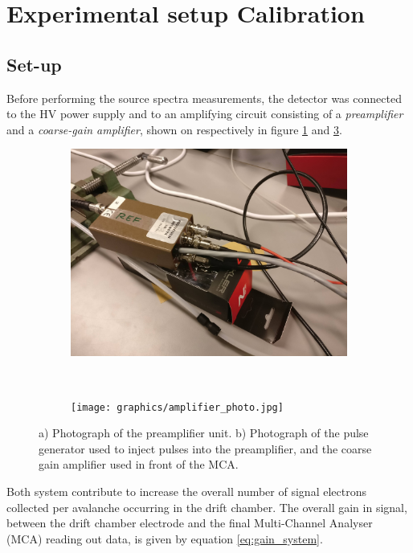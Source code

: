 \section{Experimental setup Cali\-bra\-ti\-on}

\subsection{Set-up}
\label{sec:calibration:set-up}
Before performing the source spectra measurements, the detector was connected to the HV power supply and to an amplifying circuit consisting of a \textit{preamplifier} and a \textit{coarse-gain amplifier}, shown on respectively in figure \ref{fig:preamp_photo} and \ref{fig:ampli_gene}. 

\begin{figure}[htb!]
  \begin{subfigure}[b]{0.45\textwidth}
    \includegraphics[width=\textwidth]{graphics/preamplifier.jpg}
    \caption{}
    \label{fig:preamp_photo}
  \end{subfigure}
  ~
  \begin{subfigure}[b]{0.5\textwidth}
    \texttt{[image: graphics/amplifier\_photo.jpg]}
    \caption{}
    \label{fig:ampli_gene}
  \end{subfigure}
  \caption{a) Photograph of the preamplifier unit. b) Photograph of the pulse generator used to inject pulses into the preamplifier, and the coarse gain amplifier used in front of the MCA.}
\end{figure}

Both system contribute to increase the overall number of signal electrons collected per avalanche occurring in the drift chamber. The overall gain in signal, between the drift chamber electrode and the final Multi-Channel Analyser (MCA) reading out data, is given by equation \ref{eq:gain_system}.

